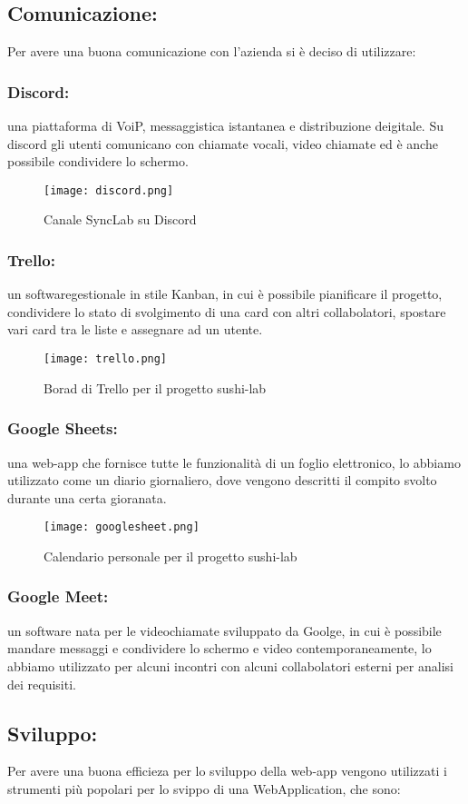 \subsection{Comunicazione:}
Per avere una buona comunicazione con l'azienda si è deciso di utilizzare:
\subsubsection{Discord:}
una piattaforma di VoiP, messaggistica istantanea e distribuzione deigitale. Su discord gli utenti comunicano con chiamate vocali, video chiamate ed è anche possibile condividere lo schermo.
\begin{figure}[H]
    \centering
    \texttt{[image: discord.png]}
    \caption{Canale SyncLab su Discord}
\end{figure}
\subsubsection{Trello:}
un softwaregestionale in stile Kanban, in cui è possibile pianificare il progetto, condividere lo stato di svolgimento di una card con altri collabolatori, spostare vari card tra le liste e assegnare ad un utente.
\begin{figure}[H]
    \centering
    \texttt{[image: trello.png]}
    \caption{Borad di Trello per il progetto sushi-lab}
\end{figure}
\subsubsection{Google Sheets:}
una web-app che fornisce tutte le funzionalità di un foglio elettronico, lo abbiamo utilizzato come un diario giornaliero, dove vengono descritti il compito svolto durante una certa gioranata.
\begin{figure}[H]
    \centering
    \texttt{[image: googlesheet.png]}
    \caption{Calendario personale per il progetto sushi-lab}
\end{figure}
\subsubsection{Google Meet:}
un software nata per le videochiamate sviluppato da Goolge, in cui è possibile mandare messaggi e condividere lo schermo e video contemporaneamente, lo abbiamo utilizzato per alcuni incontri con alcuni collabolatori esterni per analisi dei requisiti.
\subsection{Sviluppo:}
Per avere una buona efficieza per lo sviluppo della web-app vengono utilizzati i strumenti più popolari per lo svippo di una WebApplication, che sono:

